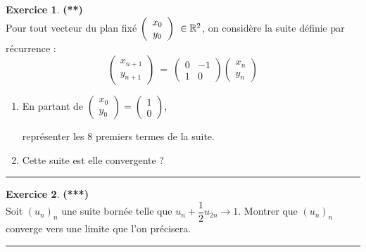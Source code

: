 \documentclass[a4paper,11pt]{article}
\theoremstyle{definition}
\newtheorem{exo}{Exercice} %
\begin{document}
\begin{minipage}{1\linewidth}
	\begin{minipage}[t]{0.48\linewidth}
		\raggedright
		
				\begin{exo}\textbf{(**)}\quad\\[0.2cm]
			Pour tout vecteur du plan fixé $\left(\begin{array}{c}
			x_0\\
			y_0
			\end{array}\right) \ \in\mathbb{R}^2$, on considère la suite définie par récurrence :
			$$\left(\begin{array}{c}
			x_{n+1}\\
			y_{n+1}
			\end{array}\right) \ = \ \left(\begin{array}{cc}
			0 & -1\\
			1 & 0
			\end{array}\right) \left(\begin{array}{c}
			x_n\\
			y_n
			\end{array}\right)$$
			\begin{enumerate}
				\item En partant de $\left(\begin{array}{c}
				x_0\\
				y_0
				\end{array}\right)  =  \left(\begin{array}{c}
				1\\
				0
				\end{array}\right) $,
				
				représenter les $8$ premiers termes de la suite.
				\item Cette suite est elle convergente ? 
			\end{enumerate}
			
			
			\centering
			\rule{1\linewidth}{0.6pt}
		\end{exo}
		
		
		\begin{exo}\textbf{(***)}\quad\\[0.2cm]
			Soit $(u_n)_n$ une suite bornée telle que $u_n + \dfrac{1}{2} u_{2n} \longrightarrow 1$. Montrer que $(u_n )_n$ converge vers une limite que l’on
			précisera.
			
			\centering
			\rule{1\linewidth}{0.6pt}
		\end{exo}
	


\end{minipage}
\end{minipage}
\end{document}
